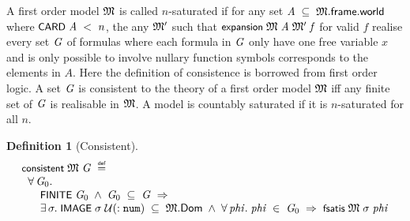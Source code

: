 \documentclass[letterpaper]{article}
\newtheorem{defn}{Definition}
\renewcommand{\HOLConst}[1]{{\textsf{\upshape\small #1}}}
\renewcommand{\HOLinline}[1]{\ensuremath{#1}}
\newenvironment{holmath}{\begin{displaymath}\begin{array}{l}}{\end{array}\end{displaymath}\ignorespacesafterend}
\begin{document}
A first order model \HOLinline{\HOLFreeVar{\ensuremath{\mathfrak{M}}}} is called $n$-saturated if for any set \HOLinline{\HOLFreeVar{A}\;\HOLSymConst{\HOLTokenSubset{}}\;\HOLFreeVar{\ensuremath{\mathfrak{M}}}.\HOLFieldName{frame}.\HOLFieldName{world}} where \HOLinline{\HOLConst{CARD}\;\HOLFreeVar{A}\;\HOLSymConst{\HOLTokenLt{}}\;\HOLFreeVar{n}}, the any \HOLinline{\HOLFreeVar{\ensuremath{\mathfrak{M}'}}} such that \HOLinline{\HOLConst{expansion}\;\HOLFreeVar{\ensuremath{\mathfrak{M}}}\;\HOLFreeVar{A}\;\HOLFreeVar{\ensuremath{\mathfrak{M}'}}\;\HOLFreeVar{f}} for valid $f$ realise every set \HOLinline{\HOLFreeVar{G}} of formulas where each formula in \HOLinline{\HOLFreeVar{G}} only have one free variable $x$ and is only possible to involve nullary function symbols corresponds to the elements in $A$. Here the definition of consistence is borrowed from first order logic. A set \HOLinline{\HOLFreeVar{G}} is consistent to the theory of a first order model \HOLinline{\HOLFreeVar{\ensuremath{\mathfrak{M}}}} iff any finite set of \HOLinline{\HOLFreeVar{G}} is realisable in \HOLinline{\HOLFreeVar{\ensuremath{\mathfrak{M}}}}. A model is countably saturated if it is $n$-saturated for all $n$.
\begin{defn}[Consistent]
\begin{holmath}
  \HOLConst{consistent}\;\HOLFreeVar{\ensuremath{\mathfrak{M}}}\;\HOLFreeVar{G}\;\HOLSymConst{\HOLTokenDefEquality{}}\\
\;\;\HOLSymConst{\HOLTokenForall{}}\HOLBoundVar{G\sb{\mathrm{0}}}.\\
\;\;\;\;\;\;\HOLConst{FINITE}\;\HOLBoundVar{G\sb{\mathrm{0}}}\;\HOLSymConst{\HOLTokenConj{}}\;\HOLBoundVar{G\sb{\mathrm{0}}}\;\HOLSymConst{\HOLTokenSubset{}}\;\HOLFreeVar{G}\;\HOLSymConst{\HOLTokenImp{}}\\
\;\;\;\;\;\;\HOLSymConst{\HOLTokenExists{}}\HOLBoundVar{\ensuremath{\sigma}}.\;\HOLConst{IMAGE}\;\HOLBoundVar{\ensuremath{\sigma}}\;\ensuremath{\cal{U}}(:\HOLTyOp{num})\;\HOLSymConst{\HOLTokenSubset{}}\;\HOLFreeVar{\ensuremath{\mathfrak{M}}}.\HOLFieldName{Dom}\;\HOLSymConst{\HOLTokenConj{}}\;\HOLSymConst{\HOLTokenForall{}}\HOLBoundVar{phi}.\;\HOLBoundVar{phi}\;\HOLSymConst{\HOLTokenIn{}}\;\HOLBoundVar{G\sb{\mathrm{0}}}\;\HOLSymConst{\HOLTokenImp{}}\;\HOLConst{fsatis}\;\HOLFreeVar{\ensuremath{\mathfrak{M}}}\;\HOLBoundVar{\ensuremath{\sigma}}\;\HOLBoundVar{phi}
\end{holmath}
\end{defn}
\end{document}
